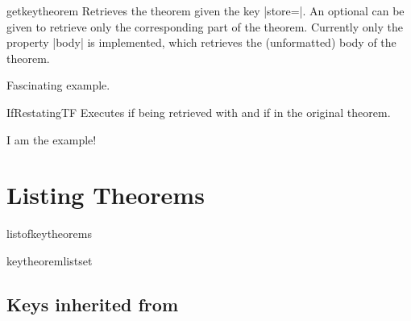 \documentclass{ltxdoc}
\begin{document}
\begin{docCommand}{getkeytheorem}
  {}
Retrieves the theorem given the key |store=|. An optional  can be given to retrieve only the corresponding part of the theorem. Currently only the property |body| is implemented, which retrieves the (unformatted) body of the theorem.

\begin{keythmscode}[]

\begin{example}[store=mytag]
Fascinating example.
\end{example}

\end{keythmscode}

\end{docCommand}

\begin{docCommand}{IfRestatingTF}
  {}
Executes  if being retrieved with  and  if in the original theorem.

\begin{keythmscode}[]
\begin{example}[store=hmm]
I am the
example!
\end{example}

\end{keythmscode}

\end{docCommand}

\section{Listing Theorems}

\begin{docCommand}{listofkeytheorems}
  {}

\end{docCommand}

\begin{docCommand}{keytheoremlistset}
  {}

\end{docCommand}

\begin{keythmscode}[]
\listofkeytheorems
\end{keythmscode}

\subsection{Keys inherited from }
\end{document}
